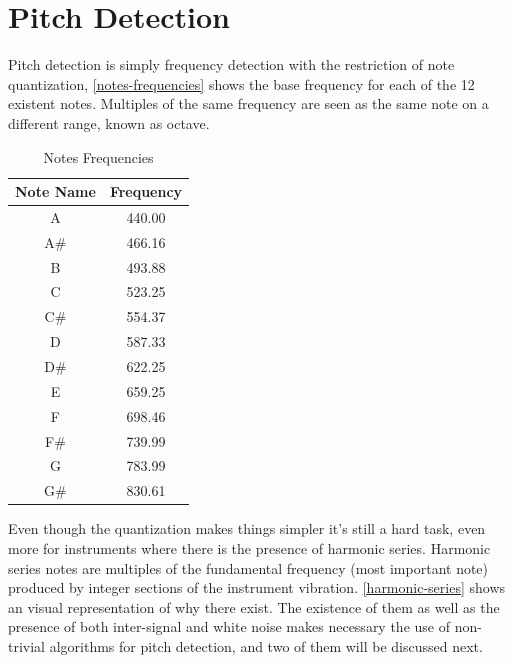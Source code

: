 \chapter{Pitch Detection}
\label{pitch-detection}

Pitch detection is simply frequency detection with the restriction of note quantization,
\autoref{notes-frequencies} shows the base frequency for each of the 12 existent
notes. Multiples of the same frequency are seen as the same note on a different
range, known as octave.
\begin{table}[htb]
  \begin{center}
    \ABNTEXreducedfont
    \caption[Notes Frequencies]{Notes Frequencies}
    \label{notes-frequencies}
    \begin{tabular}{c|c}
      \hline
      Note Name & Frequency\\
      \hline
      A & 440.00 \\
      A\# & 466.16 \\
      B & 493.88 \\
      C & 523.25 \\
      C\# & 554.37 \\
      D & 587.33 \\
      D\# & 622.25 \\
      E & 659.25 \\
      F & 698.46 \\
      F\# & 739.99 \\
      G & 783.99 \\
      G\# & 830.61 \\
      \hline
    \end{tabular}
  \end{center}
\end{table}
Even though the quantization makes things simpler it's still a hard task, even
more for instruments where there is the presence of harmonic series. Harmonic
series notes are multiples of the fundamental frequency (most important
note) produced by integer sections of the instrument vibration. \autoref{harmonic-series}
shows an visual representation of why there exist. The existence of them as well
as the presence of both inter-signal and white noise makes necessary the use of
non-trivial algorithms for pitch detection, and two of them will be discussed next.

